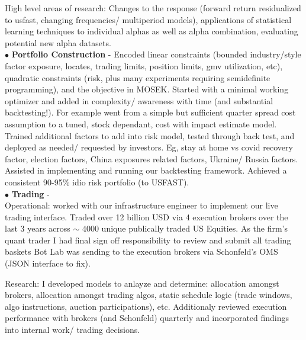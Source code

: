 \documentclass[a4paper,20pt]{article}
\begin{document}
{                 High level areas of research: Changes to the response (forward return residualized to usfast, changing frequencies/ multiperiod models), applications of statistical learning techniques to
                 individual alphas as well as alpha combination, evaluating potential new alpha datasets.
                 \\$\bullet$ \textbf{Portfolio Construction} - Encoded linear constraints (bounded industry/style factor exposure, locates, trading limits, position limits, gmv utilization, etc), quadratic
                 constraints (risk, plus many experiments requiring semidefinite programming), and the objective in MOSEK. Started with a minimal working optimizer and added in complexity/ awareness with time (and
                 substantial backtesting!). For example went from a simple but sufficient quarter spread cost
                 assumption to a tuned, stock dependant, cost with impact estimate model. Trained additional factors to add into risk model, tested through back test, and deployed as needed/ requested by
                 investors. Eg, stay at home vs covid recovery factor, election factors, China exposures related factors, Ukraine/ Russia factors. Assisted in implementing and running our backtesting framework.
                 Achieved a consistent 90-95\% idio risk portfolio (to USFAST).
                 \\$\bullet$ \textbf{Trading} -\\
                 Operational: worked with our infrastructure engineer to implement our live trading interface.
                 Traded over 12 billion USD via 4 execution brokers over the last 3 years across $\sim$ 4000 unique publically traded US Equities. As the firm's
                 quant trader I had final sign off responsibility to review and submit all trading baskets Bot Lab was sending to the execution brokers via Schonfeld's OMS (JSON interface to fix).

                 Research: I developed models to anlayze and determine: allocation amongst brokers, allocation amongst trading algos,
                 static schedule logic (trade windows, algo instructions, auction participations), etc.
                 Additionaly reviewed execution performance with brokers (and Schonfeld) quarterly and incorporated findings into internal work/ trading decisions.
               }
\end{document}
